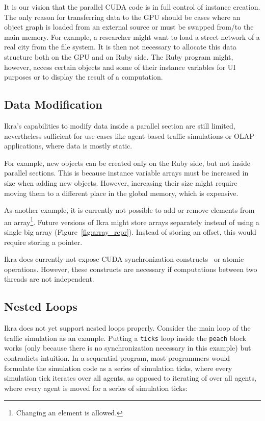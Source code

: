 \documentclass[preprint]{sigplanconf}
\begin{document}
It is our vision that the parallel CUDA code is in full control of instance creation. The only reason for transferring data to the GPU should be cases where an object graph is loaded from an external source or must be swapped from/to the main memory. For example, a researcher might want to load a street network of a real city from the file system. It is then not necessary to allocate this data structure both on the GPU and on Ruby side. The Ruby program might, however, access certain objects and some of their instance variables for UI purposes or to display the result of a computation.

\subsection{Data Modification}
\label{sec:gen_new_obj}
Ikra's capabilities to modify data inside a parallel section are still limited, nevertheless sufficient for use cases like agent-based traffic simulations or OLAP applications, where data is mostly static.

For example, new objects can be created only on the Ruby side, but not inside parallel sections. This is because instance variable arrays must be increased in size when adding new objects. However, increasing their size might require moving them to a different place in the global memory, which is expensive.

As another example, it is currently not possible to add or remove elements from an array\footnote{Changing an element is allowed.}. Future versions of Ikra might store arrays separately instead of using a single big array (Figure~\ref{fig:array_repr}). Instead of storing an offset, this would require storing a pointer.

Ikra does currently not expose CUDA synchronization constructs~\cite{gpusync} or atomic operations. However, these constructs are necessary if computations between two threads are not independent.


\subsection{Nested Loops}
\label{sec:nested_loops}
Ikra does not yet support nested loops properly. Consider the main loop of the traffic simulation as an example. Putting a \texttt{ticks} loop inside the \texttt{peach} block works (only because there is no synchronization necessary in this example) but contradicts intuition. In a sequential program, most programmers would formulate the simulation code as a series of simulation ticks, where every simulation tick iterates over all agents, as opposed to iterating of over all agents, where every agent is moved for a series of simulation ticks:
\end{document}
